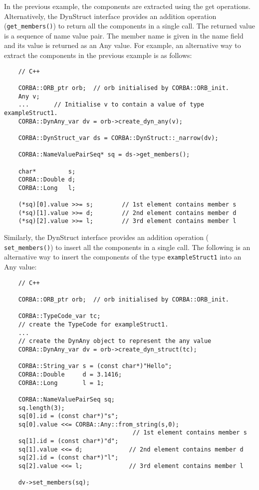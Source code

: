 \documentclass[11pt,twoside,onecolumn]{book}
\begin{document}
In the previous example, the components are extracted using the get
operations. Alternatively, the DynStruct interface provides an addition
operation ({\tt get\_members()}) to return all the components in a single
call. The returned value is a sequence of name value pair. The member name
is given in the name field and its value is returned as an Any value.
For example, an alternative way to extract the components in the previous
example is as follows:

{\small
\begin{verbatim}
    // C++
    
    CORBA::ORB_ptr orb;  // orb initialised by CORBA::ORB_init.
    Any v;
    ...       // Initialise v to contain a value of type exampleStruct1.
    CORBA::DynAny_var dv = orb->create_dyn_any(v);
    
    CORBA::DynStruct_var ds = CORBA::DynStruct::_narrow(dv);
    
    CORBA::NameValuePairSeq* sq = ds->get_members();
    
    char*         s;
    CORBA::Double d;
    CORBA::Long   l;
    
    (*sq)[0].value >>= s;        // 1st element contains member s
    (*sq)[1].value >>= d;        // 2nd element contains member d
    (*sq)[2].value >>= l;        // 3rd element contains member l
\end{verbatim}
}

Similarly, the DynStruct interface provides an addition operation ({\tt
set\_members()}) to insert all the components in a single call. The
following is an alternative way to insert the components of the type
{\tt exampleStruct1} into an Any value:

{\small
\begin{verbatim}
    // C++
    
    CORBA::ORB_ptr orb;  // orb initialised by CORBA::ORB_init.
    
    CORBA::TypeCode_var tc;
    // create the TypeCode for exampleStruct1.
    ...
    // create the DynAny object to represent the any value
    CORBA::DynAny_var dv = orb->create_dyn_struct(tc);
    
    CORBA::String_var s = (const char*)"Hello";
    CORBA::Double     d = 3.1416;
    CORBA::Long       l = 1;
    
    CORBA::NameValuePairSeq sq;
    sq.length(3);
    sq[0].id = (const char*)"s";
    sq[0].value <<= CORBA::Any::from_string(s,0); 
                                    // 1st element contains member s
    sq[1].id = (const char*)"d";
    sq[1].value <<= d;             // 2nd element contains member d
    sq[2].id = (const char*)"l";
    sq[2].value <<= l;             // 3rd element contains member l
    
    dv->set_members(sq);    
\end{verbatim}
}
\end{document}
